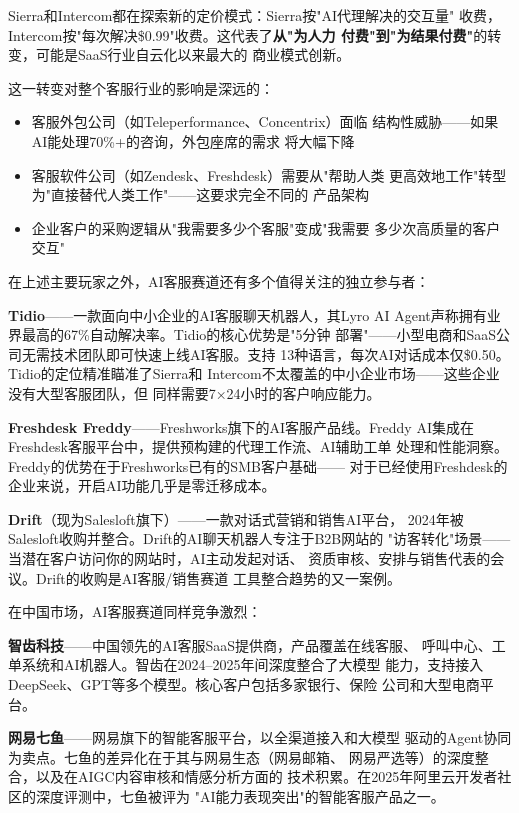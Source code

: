 Sierra和Intercom都在探索新的定价模式：Sierra按"AI代理解决的交互量"
收费，Intercom按"每次解决\$0.99"收费。这代表了\textbf{从"为人力
付费"到"为结果付费"}的转变，可能是SaaS行业自云化以来最大的
商业模式创新。

这一转变对整个客服行业的影响是深远的：

\begin{itemize}
  \item 客服外包公司（如Teleperformance、Concentrix）面临
    结构性威胁——如果AI能处理70\%+的咨询，外包座席的需求
    将大幅下降
  \item 客服软件公司（如Zendesk、Freshdesk）需要从"帮助人类
    更高效地工作"转型为"直接替代人类工作"——这要求完全不同的
    产品架构
  \item 企业客户的采购逻辑从"我需要多少个客服"变成"我需要
    多少次高质量的客户交互"
\end{itemize}

在上述主要玩家之外，AI客服赛道还有多个值得关注的独立参与者：

\textbf{Tidio}——一款面向中小企业的AI客服聊天机器人，其Lyro AI
Agent声称拥有业界最高的67\%自动解决率。Tidio的核心优势是"5分钟
部署"——小型电商和SaaS公司无需技术团队即可快速上线AI客服。支持
13种语言，每次AI对话成本仅\$0.50。Tidio的定位精准瞄准了Sierra和
Intercom不太覆盖的中小企业市场——这些企业没有大型客服团队，但
同样需要7×24小时的客户响应能力。

\textbf{Freshdesk Freddy}——Freshworks旗下的AI客服产品线。Freddy
AI集成在Freshdesk客服平台中，提供预构建的代理工作流、AI辅助工单
处理和性能洞察。Freddy的优势在于Freshworks已有的SMB客户基础——
对于已经使用Freshdesk的企业来说，开启AI功能几乎是零迁移成本。

\textbf{Drift}（现为Salesloft旗下）——一款对话式营销和销售AI平台，
2024年被Salesloft收购并整合。Drift的AI聊天机器人专注于B2B网站的
"访客转化"场景——当潜在客户访问你的网站时，AI主动发起对话、
资质审核、安排与销售代表的会议。Drift的收购是AI客服/销售赛道
工具整合趋势的又一案例。

在中国市场，AI客服赛道同样竞争激烈：

\textbf{智齿科技}——中国领先的AI客服SaaS提供商，产品覆盖在线客服、
呼叫中心、工单系统和AI机器人。智齿在2024--2025年间深度整合了大模型
能力，支持接入DeepSeek、GPT等多个模型。核心客户包括多家银行、保险
公司和大型电商平台。

\textbf{网易七鱼}——网易旗下的智能客服平台，以全渠道接入和大模型
驱动的Agent协同为卖点。七鱼的差异化在于其与网易生态（网易邮箱、
网易严选等）的深度整合，以及在AIGC内容审核和情感分析方面的
技术积累。在2025年阿里云开发者社区的深度评测中，七鱼被评为
"AI能力表现突出"的智能客服产品之一。

